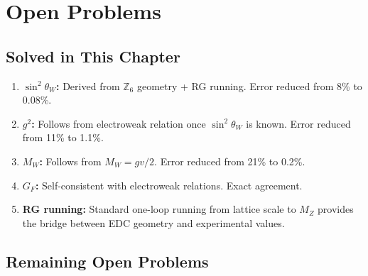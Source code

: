 \section{Open Problems}
\label{sec:ch3_open}

\subsection*{Solved in This Chapter}

\begin{enumerate}
  \item[\checkmark] \textbf{$\sin^2\theta_W$:} Derived from $\mathbb{Z}_6$ geometry + RG running.
        Error reduced from 8\% to 0.08\%.

  \item[\checkmark] \textbf{$g^2$:} Follows from electroweak relation once $\sin^2\theta_W$ is known.
        Error reduced from 11\% to 1.1\%.

  \item[\checkmark] \textbf{$M_W$:} Follows from $M_W = gv/2$.
        Error reduced from 21\% to 0.2\%.

  \item[\checkmark] \textbf{$G_F$:} Self-consistent with electroweak relations. Exact agreement.

  \item[\checkmark] \textbf{RG running:} Standard one-loop running from lattice scale to $M_Z$
        provides the bridge between EDC geometry and experimental values.
\end{enumerate}

\subsection*{Remaining Open Problems}

